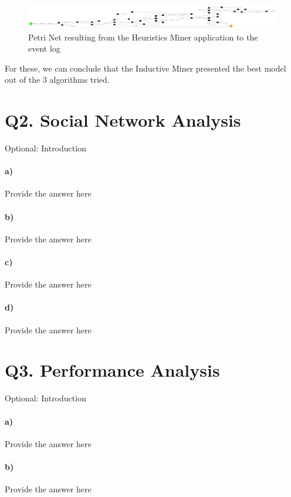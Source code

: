 \documentclass[12pt]{report}
\begin{document}
\begin{figure}[h]
    \centering
    \includegraphics[width=\textwidth]{figures/q1_f_heuristics_miner.pdf}
    \caption{Petri Net resulting from the Heuristics Miner application to the event log}
    \label{fig:figures-q1_f_heuristics_miner-pdf}
\end{figure}

For these, we can conclude that the Inductive Miner presented the best model out of the 3 algorithms tried.

\section{Q2. Social Network Analysis}
\textlangle Optional: Introduction \textrangle
\paragraph{a)} \textlangle Provide the answer here\textrangle
\paragraph{b)} \textlangle Provide the answer here\textrangle
\paragraph{c)} \textlangle Provide the answer here\textrangle
\paragraph{d)} \textlangle Provide the answer here\textrangle

\section{Q3. Performance Analysis}
\textlangle Optional: Introduction \textrangle
\paragraph{a)} \textlangle Provide the answer here\textrangle
\paragraph{b)} \textlangle Provide the answer here\textrangle
\end{document}
